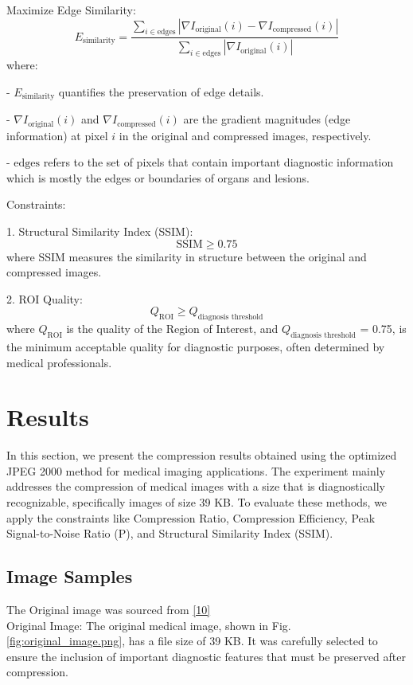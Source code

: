 \documentclass[conference,letterpaper]{IEEEtran}
\begin{document}
Maximize Edge Similarity:
\[
E_{\text{similarity}} = \frac{\sum_{i \in \text{edges}} \left| \nabla I_{\text{original}}(i) - \nabla I_{\text{compressed}}(i) \right|}{\sum_{i \in \text{edges}} \left| \nabla I_{\text{original}}(i) \right|}
\]
where:

- \( E_{\text{similarity}} \) quantifies the preservation of edge details.

- \( \nabla I_{\text{original}}(i) \) and \( \nabla I_{\text{compressed}}(i) \) are the gradient magnitudes (edge information) at pixel \( i \) in the original and compressed images, respectively.

- \( \text{edges} \) refers to the set of pixels that contain important diagnostic information which is mostly the edges or boundaries of organs and lesions.


Constraints:

1. Structural Similarity Index (SSIM):
   \[
   \text{SSIM} \geq 0.75
   \]
   where SSIM measures the similarity in structure between the original and compressed images.

2. ROI Quality:
   \[
   Q_{\text{ROI}} \geq Q_{\text{diagnosis threshold}}
   \]
   where \( Q_{\text{ROI}} \) is the quality of the Region of Interest, and \( Q_{\text{diagnosis threshold}} \) = 0.75, is the minimum acceptable quality for diagnostic purposes, often determined by medical professionals.




\section{Results}

In this section, we present the compression results obtained using the optimized JPEG 2000 method for medical imaging applications. The experiment mainly addresses the compression of medical images with a size that is diagnostically recognizable, specifically images of size 39 KB. To evaluate these methods, we apply the constraints like Compression Ratio, Compression Efficiency, Peak Signal-to-Noise Ratio (P), and Structural Similarity Index (SSIM).

\subsection{Image Samples}
The Original image was sourced from  \href{https://pydicom.github.io/pydicom/stable/tutorials/dataset_basics.html#reading}{[10]} \\
Original Image: The original medical image, shown in Fig. \ref{fig:original_image.png}, has a file size of 39 KB. It was carefully selected to ensure the inclusion of important diagnostic features that must be preserved after compression.
\end{document}

